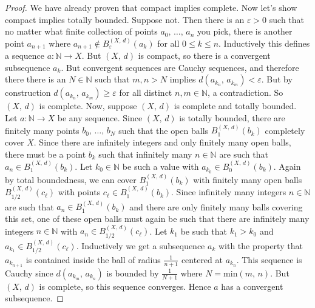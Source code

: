 \documentclass{article}
\theoremstyle{plain}
\theoremstyle{normal}
\begin{document}
        \begin{proof}
            We have already proven that compact implies complete. Now let's
            show compact implies totally bounded. Suppose not. Then there is
            an $\varepsilon>0$ such that no matter what finite collection of
            points $a_{0},\,\dots,\,a_{n}$ you pick, there is another point
            $a_{n+1}$ where $a_{n+1}\notin{B}_{\varepsilon}^{(X,\,d)}(a_{k})$
            for all $0\leq{k}\leq{n}$. Inductively this defines a sequence
            $a:\mathbb{N}\rightarrow{X}$. But $(X,\,d)$ is compact, so there
            is a convergent subsequence $a_{k}$. But convergent sequences are
            Cauchy sequences, and therefore there there is an
            $N\in\mathbb{N}$ such that $m,n>N$ implies
            $d(a_{k_{n}},\,a_{k_{m}})<\varepsilon$. But by construction
            $d(a_{k_{n}},\,a_{k_{m}})\geq\varepsilon$ for all distinct
            $n,m\in\mathbb{N}$, a contradiction. So $(X,\,d)$ is complete.
            Now, suppose $(X,\,d)$ is complete and totally bounded. Let
            $a:\mathbb{N}\rightarrow{X}$ be any sequence. Since
            $(X,\,d)$ is totally bounded, there are finitely many points
            $b_{0},\,\dots,\,b_{N}$ such that the open balls
            $B_{1}^{(X,\,d)}(b_{k})$ completely cover $X$. Since there are
            infinitely integers and only finitely many open balls, there
            must be a point $b_{k}$ such that infinitely many $n\in\mathbb{N}$
            are such that $a_{n}\in{B}_{1}^{(X,\,d)}(b_{k})$. Let
            $k_{0}\in\mathbb{N}$ be such a value
            with $a_{k_{0}}\in{B}_{0}^{(X,\,d)}(b_{k})$. Again by total
            boundedness, we can cover $B_{1}^{(X,\,d)}(b_{k})$ with finitely
            many open balls $B_{1/2}^{(X,\,d)}(c_{\ell})$ with points
            $c_{\ell}\in{B}_{1}^{(X,\,d)}(b_{k})$. Since infinitely many integers
            $n\in\mathbb{N}$ are such that $a_{n}\in{B}_{1}^{(X,\,d)}(b_{k})$
            and there are only finitely many balls covering this set,
            one of these open balls must again be such that there are
            infinitely many integers $n\in\mathbb{N}$ with
            $a_{n}\in{B}_{1/2}^{(X,\,d)}(c_{\ell})$. Let
            $k_{1}$ be such that $k_{1}>k_{0}$ and
            $a_{k_{1}}\in{B}_{1/2}^{(X,\,d)}(c_{\ell})$. Inductively
            we get a subsequence $a_{k}$ with the property that
            $a_{k_{n+1}}$ is contained inside the ball of radius
            $\frac{1}{n+1}$ centered at $a_{k_{n}}$. This sequence is
            Cauchy since $d(a_{k_{m}},\,a_{k_{n}})$ is bounded by
            $\frac{1}{N+1}$ where $N=\textrm{min}(m,\,n)$. But $(X,\,d)$ is
            complete, so this sequence
            converges. Hence $a$ has a convergent subsequence.
        \end{proof}
\end{document}
